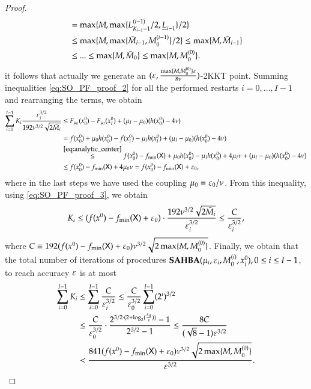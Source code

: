 \begin{proof}
\begin{align}
&= \max\{M,\max\{L_{K_{i-1}-1}^{(i-1)}/2,\underline{L}_{i-1}\}/2\} \notag\\
&\leq  \max\{M,\max\{\bar{M}_{i-1},M_0^{(i-1)}\}/2\} \leq  \max\{M,\bar{M}_{i-1}\} \notag\\
&\leq ... \leq \max\{M,\bar{M}_{0}\} \leq  \max\{M,M_0^{(0)}\}.\label{eq:SO_PF_proof_3} 
\end{align}
it follows that actually we generate an $(\varepsilon,\frac{\max\{M,M_{0}^{(0)}\}\varepsilon}{8\nu})$-2KKT point. Summing inequalities \eqref{eq:SO_PF_proof_2} for all the performed restarts $i=0,...,I-1$ and rearranging the terms, we obtain
\begin{align*}
\sum_{i=0}^{I-1} K_i \frac{\varepsilon_i^{3/2}}{192 \nu^{3/2} \sqrt{2\bar{M}_i} }  & \leq F_{\mu_0}(x^{0}_0) - F_{\mu_{I}}(x^{0}_{I}) + (\mu_{I} - \mu_{0}) (h(x_0^0)-4\nu) \notag \\
&=f(x^{0}_0) + \mu_0 h(x^{0}_0)- f(x^{0}_{I}) - \mu_{I}h(x^{0}_{I}) + (\mu_{I} - \mu_{0}) (h(x_0^0)-4\nu) \notag \\
& \stackrel{\eqref{eq:analytic_center}}{\leq} f(x^{0}_0) - f_{\min}(\mathsf{X}) + \mu_0 h(x^{0}_0) - \mu_{I}h(x^{0}_{0}) + 4\mu_{I} \nu + (\mu_{I} - \mu_{0}) (h(x_0^0)-4\nu) \notag \\ 
& \leq f(x^{0}_0) - f_{\min}(\mathsf{X}) + 4\mu_0 \nu = f(x^{0}_0) - f_{\min}(\mathsf{X}) + \varepsilon_0,
\end{align*}
where in the last steps we have used the coupling $\mu_{0}=\varepsilon_{0}/\nu$. From this inequality, using \eqref{eq:SO_PF_proof_3}, we obtain
\begin{align}
K_i \leq  (f(x^{0}) - f_{\min}(\mathsf{X})+  \varepsilon_0) \cdot \frac{192\nu^{3/2}\sqrt{2\bar{M}_i}}{\varepsilon_i^{3/2}} \leq \frac{C}{\varepsilon_i^{3/2}},
\label{eq:SO_PF_proof_4} 
\end{align}
where $C \equiv 192(f(x^{0})-f_{\min}(\mathsf{X})+\varepsilon_0)\nu^{3/2}\sqrt{2\max\{M,M_0^{(0)}\}}$. Finally, we obtain that the total number of iterations of procedures $\operatorname{\mathbf{SAHBA}}(\mu_{i},\varepsilon_{i},M_0^{(i)},x_{i}^{0}),0\leq i \leq I-1$, to reach accuracy $\varepsilon$ is at most
\begin{align*}
\sum_{i=0}^{I-1}K_{i}&\leq \sum_{i=0}^{I-1} \frac{C}{\varepsilon_i^{3/2}} \leq \frac{C}{\varepsilon_0^{3/2}} \sum_{i=0}^{I-1} (2^i)^{3/2} \\
&\leq \frac{C}{\varepsilon_0^{3/2}} \cdot \frac{2^{3/2\cdot(2+\log_2(\frac{\varepsilon_0}{\varepsilon}))}-1}{2^{3/2}-1}\leq \frac{8C}{(\sqrt{8}-1)\varepsilon^{3/2}}\\
&<\frac{841(f(x^{0})-f_{\min}(\mathsf{X})+\varepsilon_0)\nu^{3/2}\sqrt{2\max\{M,M_0^{(0)}\}}}{\varepsilon^{3/2}}.
\end{align*} 
\end{proof}
